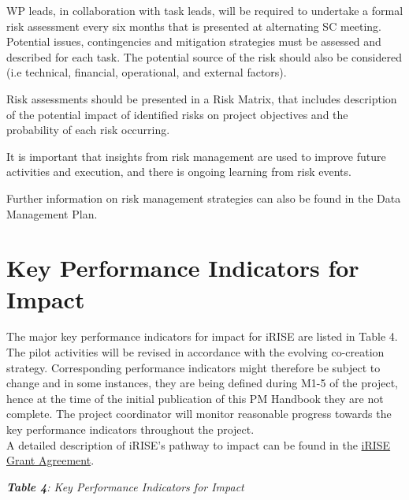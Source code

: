 \documentclass[
]{article}
\begin{document}
WP leads, in collaboration with task leads, will be required to undertake a formal risk assessment every six months that is presented at alternating SC meeting. Potential issues, contingencies and mitigation strategies must be assessed and described for each task. The potential source of the risk should also be considered (i.e technical, financial, operational, and external factors).

Risk assessments should be presented in a Risk Matrix, that includes description of the potential impact of identified risks on project objectives and the probability of each risk occurring.

It is important that insights from risk management are used to improve future activities and execution, and there is ongoing learning from risk events.

Further information on risk management strategies can also be found in the Data Management Plan.

\hypertarget{key-performance-indicators-for-impact}{%
\section{\texorpdfstring{\textbf{Key Performance Indicators for Impact}}{Key Performance Indicators for Impact}}\label{key-performance-indicators-for-impact}}

The major key performance indicators for impact for iRISE are listed in Table 4. The pilot activities will be revised in accordance with the evolving co-creation strategy. Corresponding performance indicators might therefore be subject to change and in some instances, they are being defined during M1-5 of the project, hence at the time of the initial publication of this PM Handbook they are not complete. The project coordinator will monitor reasonable progress towards the key performance indicators throughout the project.\\

A detailed description of iRISE's pathway to impact can be found in the \href{https://charitede.sharepoint.com/:b:/r/sites/iRISE/Shared\%20Documents/General/Grant\%20Agreement/Amendment\%20-\%20AMD-101094853-4_Grant\%20Agreement\%20iRISE.pdf?csf=1\&web=1\&e=SqVvdc}{iRISE Grant Agreement}.

\emph{\textbf{Table 4}: Key Performance Indicators for Impact}
\end{document}
